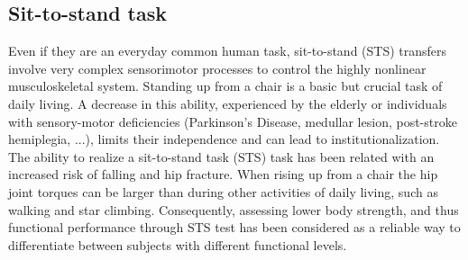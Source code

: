 \documentclass[12pt, a4paper]{article}
\begin{document}
\subsection{Sit-to-stand task}
Even if they are an everyday common human task, sit-to-stand (STS) transfers involve very complex sensorimotor processes to control the highly nonlinear musculoskeletal system. Standing up from a chair is a basic but crucial task of daily living. A decrease in this ability, experienced by the elderly or individuals with sensory-motor deficiencies (Parkinson's Disease, medullar lesion, post-stroke hemiplegia, ...), limits their independence and can lead to institutionalization. The ability to realize a sit-to-stand task (STS) task has been related with an increased risk of falling and hip fracture. When rising up from a chair the hip joint torques can be larger than during other activities of daily living, such as walking and star climbing. Consequently, assessing lower body strength, and thus functional performance through STS test has been considered as a reliable way to differentiate between subjects with different functional levels.
\end{document}
